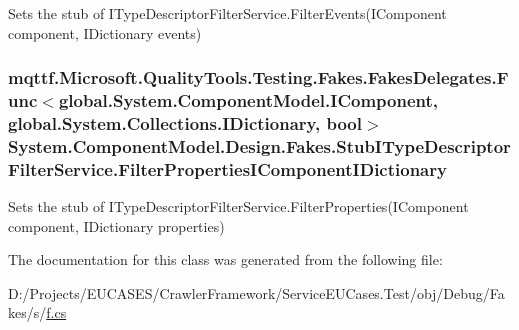 Sets the stub of I\-Type\-Descriptor\-Filter\-Service.\-Filter\-Events(\-I\-Component component, I\-Dictionary events)

\hypertarget{class_system_1_1_component_model_1_1_design_1_1_fakes_1_1_stub_i_type_descriptor_filter_service_ae7fb0adf359012daf2b1fe3def0741a5}{
\subsubsection[{Filter\-Properties\-I\-Component\-I\-Dictionary}]{\setlength{\rightskip}{0pt plus 5cm}mqttf.\-Microsoft.\-Quality\-Tools.\-Testing.\-Fakes.\-Fakes\-Delegates.\-Func$<$global.\-System.\-Component\-Model.\-I\-Component, global.\-System.\-Collections.\-I\-Dictionary, bool$>$ System.\-Component\-Model.\-Design.\-Fakes.\-Stub\-I\-Type\-Descriptor\-Filter\-Service.\-Filter\-Properties\-I\-Component\-I\-Dictionary}}\label{class_system_1_1_component_model_1_1_design_1_1_fakes_1_1_stub_i_type_descriptor_filter_service_ae7fb0adf359012daf2b1fe3def0741a5}


Sets the stub of I\-Type\-Descriptor\-Filter\-Service.\-Filter\-Properties(\-I\-Component component, I\-Dictionary properties)



The documentation for this class was generated from the following file\-:\begin{DoxyCompactItemize}
\item 
D\-:/\-Projects/\-E\-U\-C\-A\-S\-E\-S/\-Crawler\-Framework/\-Service\-E\-U\-Cases.\-Test/obj/\-Debug/\-Fakes/s/\hyperlink{s_2f_8cs}{f.\-cs}\end{DoxyCompactItemize}
